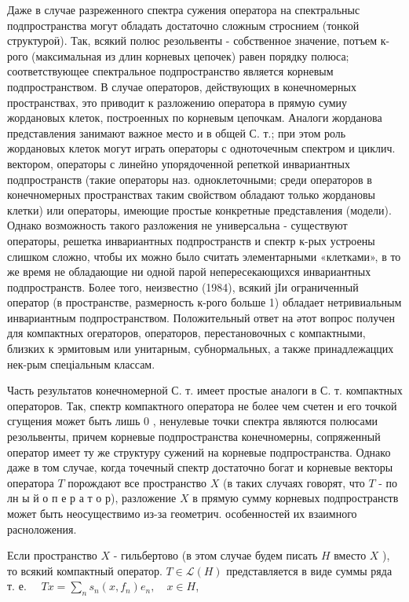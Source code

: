 \documentclass[10pt]{article}
\begin{document}
Даже в случае разреженного спектра сужения оператора на спектральныс подпространства могут обладать достаточно сложным строснием (тонкой структуроӥ). Так, всякий полюс резольвенты - собственное значение, потъем к-рого (максимальная из длин корневых цепочек) равен порядку полюса; соответствующее спектральное подпространство является корневым подпространством. В случае операторов, действующих в конечномерных пространствах, это приводит к разложению оператора в прямую сумиу жордановых клеток, построенных по корневым цепочкам. Аналоги жорданова представления занимают важное место и в общей С. т.; при этом роль жордановых клеток могут играть операторы с одноточечным спектром и циклич. вектором, операторы с линейно упорядоченной репеткой инвариантных подпространств (такие операторы наз. одноклеточными; среди операторов в конечномерных пространствах таким свойством обладают только жордановы клетки) или операторы, имеющие простые конкретные представления (модели). Однако возможность такого разложения не универсальна - существуют операторы, решетка инвариантных подпространств и спектр к-рых устроены слишком сложно, чтобы их можно было считать элементарными «клетками», в то же время не обладающие ни одной парой непересекающихся инвариантных подпространств. Более того, неизвестно (1984), всякий јІи ограниченный оператор (в пространстве, размерность к-рого больше 1) обладает нетривиальным инвариантным подпространством. Положительный ответ на әтот вопрос получен для компактных огераторов, операторов, перестановочных с компактными, близких к эрмитовым или унитарным, субнормальных, а также принадлежаццих нек-рым спеціальным классам.



Часть результатов конечномерной С. т. имеет простые аналоги в С. т. компактных операторов. Так, спектр компактного оператора не более чем счетен и его точкой сгущения может быть лишь 0 , ненулевые точки спектра являются полюсами резольвенты, причем корневые подпространства конечномерны, сопряженный оператор имеет ту же структуру сужений на корневые подпространства. Однако даже в том случае, когда точечный спектр достаточно богат и корневые векторы оператора $T$ порождают все пространство $X$ (в таких случаях говорят, что $T$ - по лн ы й о п е р а т о р), разложение $X$ в прямую сумму корневых подпространств может быть неосуществимо из-за геометрич. особенностей их взаимного расноложения.



Если пространство $X$ - гильбертово (в этом случае будем писать $H$ вместо $X$ ), то всякий компактный оператор. $T \in \mathscr{L}(H)$ представляется в виде суммы ряда т. е. $\quad T x=\sum_{n} s_{n}\left(x, f_{n}\right) e_{n}, \quad x \in H$,
\end{document}
